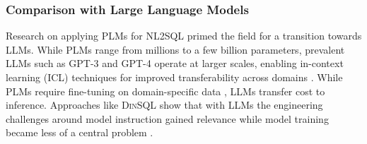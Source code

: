\subsubsection{Comparison with Large Language Models}

Research on applying PLMs for NL2SQL primed the field for a transition towards
LLMs. While PLMs range from millions to a few billion parameters,
prevalent LLMs such as GPT-3 and GPT-4 operate at larger scales, enabling
in-context learning (ICL) techniques for improved transferability
across domains \citep{DAIL-SQL}. While PLMs require fine-tuning on
domain-specific data \citep{GRAPHIX, RESDSQL}, LLMs transfer
cost to inference. Approaches like \textsc{DinSQL} show that with LLMs the
engineering challenges around model instruction gained relevance while model
training became less of a central problem \citep{DINSQL}.
